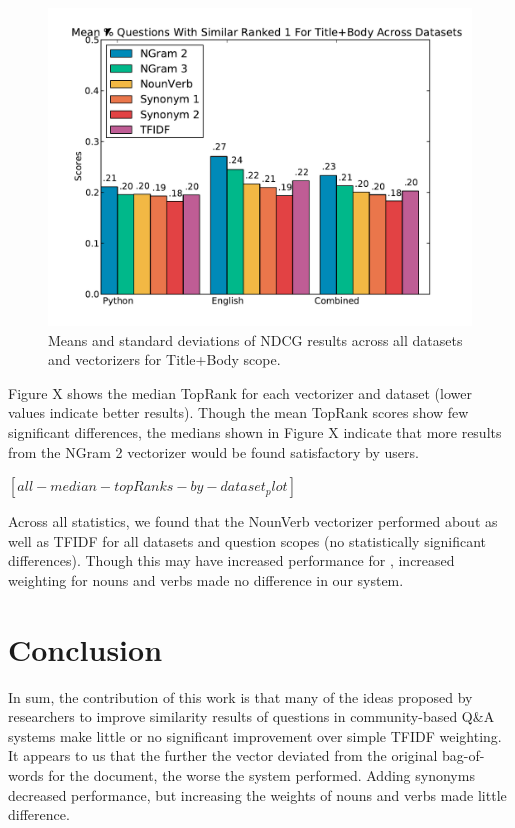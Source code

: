 \documentclass{acm_proc_article-sp}
\begin{document}
\begin{figure}[h]
\centering
\includegraphics[width=1\columnwidth]{images/all-percent@rank1-by-dataset_plot.pdf}
\caption{Means and standard deviations of NDCG results across all datasets and vectorizers for Title+Body scope.}
\label{fig:allmeans}
\end{figure}
	
Figure X shows the median TopRank for each vectorizer and dataset (lower values indicate better results). Though the mean TopRank scores show few significant differences, the medians shown in Figure X indicate that more results from the NGram 2 vectorizer would be found satisfactory by users.

$[all-median-topRanks-by-dataset_plot]$

	Across all statistics, we found that the NounVerb vectorizer performed about as well as TFIDF for all datasets and question scopes (no statistically significant differences). Though this may have increased performance for \cite{wang2009syntactic}, increased weighting for nouns and verbs  made no difference in our system.


\section{Conclusion}
In sum, the contribution of this work is that many of the ideas proposed by researchers to improve similarity results of questions in community-based Q\&A systems make little or no significant improvement over simple TFIDF weighting. It appears to us that the further the vector deviated from the original bag-of-words for the document, the worse the system performed. Adding synonyms decreased performance, but increasing the weights of nouns and verbs made little difference. 
\end{document}
